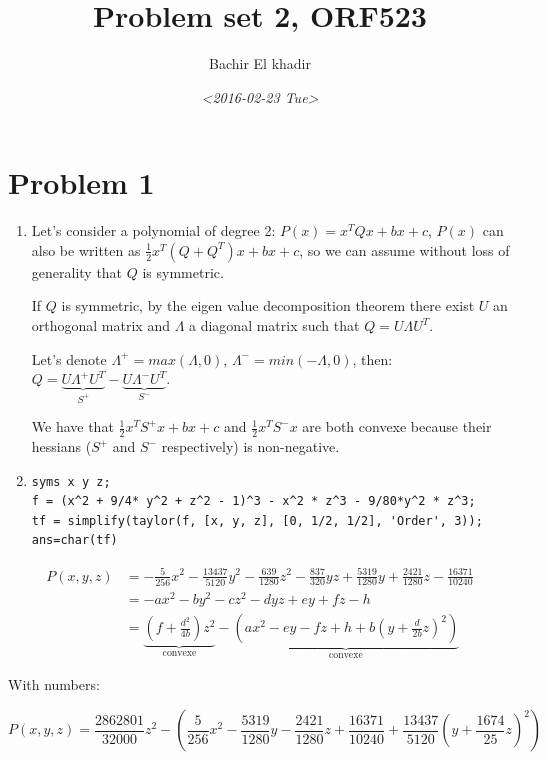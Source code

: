 \documentclass[11pt]{article}
\author{Bachir El khadir}
\date{\textit{<2016-02-23 Tue>}}
\title{Problem set 2, ORF523}
\begin{document}
\maketitle



\section{Problem 1}
\label{sec:orgheadline1}
\begin{enumerate}
\item Let's consider a polynomial of degree 2: \(P(x) = x^TQx + bx + c\), \(P(x)\) can also be written as \(\frac12 x^T(Q + Q^T)x + bx + c\), so we can assume without loss of generality that \(Q\) is symmetric.

If \(Q\) is symmetric, by the eigen value decomposition theorem there exist \(U\) an orthogonal matrix and \(\Lambda\) a diagonal matrix such that \(Q = U\Lambda U^T\).

Let's denote \(\Lambda^+ = max(\Lambda, 0)\), \(\Lambda^- = min(-\Lambda, 0)\), then: \(Q = \underbrace{U\Lambda^+ U^T}_{S^+} -  \underbrace{U\Lambda^- U^T}_{S^-}\).

We have that \(\frac12 x^TS^+x + bx + c\) and \(\frac12 x^TS^-x\) are both convexe because their hessians (\(S^+\) and \(S^-\) respectively) is non-negative.
\item \begin{verbatim}
syms x y z;
f = (x^2 + 9/4* y^2 + z^2 - 1)^3 - x^2 * z^3 - 9/80*y^2 * z^3;
tf = simplify(taylor(f, [x, y, z], [0, 1/2, 1/2], 'Order', 3));
ans=char(tf)
\end{verbatim}
\end{enumerate}

\begin{align*}
P(x, y, z) &= -\frac{5}{256} x^2 - \frac{13437}{5120}y^2 - \frac{639}{1280}z^2 - \frac{837}{320}yz
+ \frac{5319}{1280} y + \frac{2421}{1280} z  - \frac{16371}{10240}\\
&= -a x^2 - b y^2 - c z^2 - d yz + e y + fz - h
\\&=  \underbrace{(f + \frac{d^2}{4b}) z^2}_{\text{convexe}}  - \underbrace{(a x^2 - e y - fz + h + b(y + \frac{d}{2b}z)^2)}_{\text{convexe}} 
\end{align*}

With numbers:

$$P(x, y, z) = \frac{2862801}{32000} z^2 - (\frac{5}{256} x^2 - \frac{5319}{1280} y - \frac{2421}{1280} z + \frac{16371}{10240} + \frac{13437}{5120}(y + \frac{1674}{25}z)^2)$$
\end{document}
